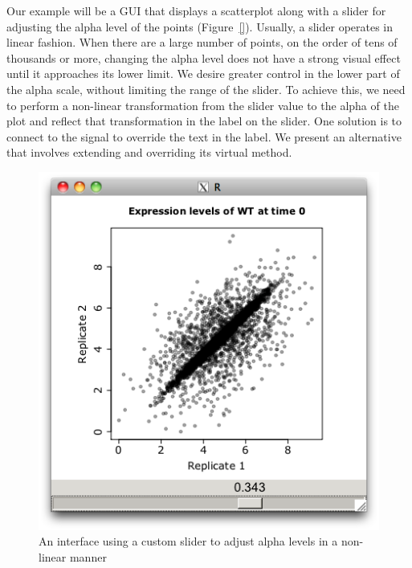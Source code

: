 Our example will be a GUI that displays a scatterplot along with a
slider for adjusting the alpha level of the points (Figure~\ref{}). Usually, a slider
operates in linear fashion. When there are a large number of points,
on the order of tens of thousands or more, changing the alpha level
does not have a strong visual effect until it approaches its lower
limit. We desire greater control in the lower part of the alpha scale,
without limiting the range of the slider. To achieve this, we need to
perform a non-linear transformation from the slider value to the alpha
of the plot and reflect that transformation in the label on the
slider. One solution is to connect to the
 signal to override the text in the
label. We present an alternative that involves extending
 and overriding its 
virtual method.

\begin{figure}
  \centering
  \includegraphics[width=.6\textwidth]{fig-RGtk2-extend-gobject} 
  \caption{An interface using a custom slider to adjust alpha levels
    in a non-linear manner}
  \label{fig:RGtk2-extend-gobject-slider}
\end{figure}

